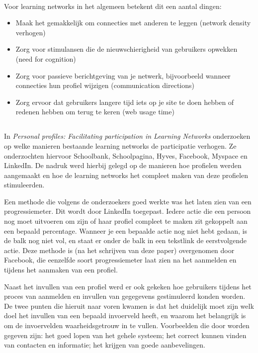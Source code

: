 \documentclass[a4paper, 10pt, pdftex]{report}
\begin{document}
        \paragraph{}
        Voor learning networks in het algemeen betekent dit een aantal dingen:
        \begin{itemize}
          \item Maak het gemakkelijk om connecties met anderen te leggen (network density verhogen)
          \item Zorg voor stimulansen die de nieuwschierigheid van gebruikers opwekken (need for cognition)
          \item Zorg voor passieve berichtgeving van je netwerk, bijvoorbeeld wanneer connecties hun profiel wijzigen (communication directions)
          \item Zorg ervoor dat gebruikers langere tijd iets op je site te doen hebben of redenen hebben om terug te keren (web usage time)
        \end{itemize}

    \subsection{\cite{Brouns2008}}

    In \emph{Personal profiles: Facilitating participation in Learning Networks} onderzoeken \citeauthor{Brouns2008} op welke manieren bestaande learning networks de participatie verhogen. Ze onderzochten hiervoor Schoolbank, Schoolpagina, Hyves, Facebook, Myspace en LinkedIn. De nadruk werd hierbij gelegd op de manieren hoe profielen werden aangemaakt en hoe de learning networks het compleet maken van deze profielen stimuleerden.

    Een methode die volgens de onderzoekers goed werkte was het laten zien van een progressiemeter. Dit wordt door LinkedIn toegepast. Iedere actie die een persoon nog moet uitvoeren om zijn of haar profiel compleet te maken zit gekoppelt aan een bepaald percentage. Wanneer je een bepaalde actie nog niet hebt gedaan, is de balk nog niet vol, en staat er onder de balk in een tekstlink de eerstvolgende actie. Deze methode is (na het schrijven van deze paper) overgenomen door Facebook, die eenzelfde soort progressiemeter laat zien na het aanmelden en tijdens het aanmaken van een profiel.

    Naast het invullen van een profiel werd er ook gekeken hoe gebruikers tijdens het proces van aanmelden en invullen van gegegevens gestimuleerd konden worden. De twee punten die hieruit naar voren kwamen is dat het duidelijk moet zijn welk doel het invullen van een bepaald invoerveld heeft, en waarom het belangrijk is om de invoervelden waarheidsgetrouw in te vullen. Voorbeelden die door \citeauthor{Brouns2008} worden gegeven zijn: het goed lopen van het gehele systeem; het correct kunnen vinden van contacten en informatie; het krijgen van goede aanbevelingen.
\end{document}
